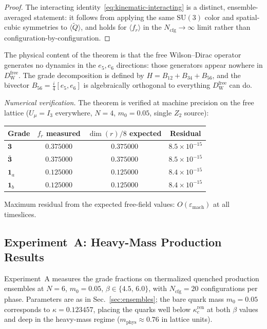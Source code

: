 \documentclass[12pt]{article}
\theoremstyle{definition}
\theoremstyle{remark}
\newcommand{\su}{\mathrm{SU}}           %
\newcommand{\dW}{D_{\mathrm{W}}}        %
\newcommand{\kcren}{\kappa_{c}^{\mathrm{ren}}}      %
\newcommand{\Qtil}{\widetilde{Q}}                    %
\newcommand{\Ncfg}{N_{\mathrm{cfg}}}                  %
\begin{document}
\begin{proof}
		The interacting identity~\eqref{eq:kinematic-interacting} is a distinct,
		ensemble-averaged statement: it follows from applying the same $\su(3)$
		color and spatial-cubic symmetries to $\langle\Qtil\rangle$, and holds for
		$\langle f_r\rangle$ in the $\Ncfg\to\infty$ limit rather than
		configuration-by-configuration.
	\end{proof}	
	The physical content of the theorem is that the free Wilson--Dirac operator
	generates no dynamics in the $e_5, e_6$ directions: those generators appear
	nowhere in $\dW^{\mathrm{free}}$.  The grade decomposition is defined by
	$H = B_{12}+B_{34}+B_{56}$, and the bivector
	$B_{56} = \tfrac{i}{4}[e_5,e_6]$ is algebraically orthogonal to everything
	$\dW^{\mathrm{free}}$ can do.
	
	\medskip
	\noindent\textit{Numerical verification.}\enspace
	The theorem is verified at machine precision on the free lattice
	($U_\mu = I_3$ everywhere, $N=4$, $m_0=0.05$, single $Z_2$ source):
	\begin{center}
		\begin{tabular}{@{}lccc@{}}
			\toprule
			Grade & $f_r$ measured & $\dim(r)/8$ expected & Residual \\
			\midrule
			$\mathbf{3}$         & $0.375000$ & $0.375000$ & $8.5\times10^{-15}$ \\
			$\bar{\mathbf{3}}$   & $0.375000$ & $0.375000$ & $8.5\times10^{-15}$ \\
			$\mathbf{1}_a$       & $0.125000$ & $0.125000$ & $8.4\times10^{-15}$ \\
			$\mathbf{1}_b$       & $0.125000$ & $0.125000$ & $8.4\times10^{-15}$ \\
			\bottomrule
		\end{tabular}
	\end{center}
	Maximum residual from the expected free-field values:
	$O(\varepsilon_{\mathrm{mach}})$ at all timeslices.
	
	
	
	\subsection{Experiment~A: Heavy-Mass Production Results}
	\label{sec:experiment-A}
	
	Experiment~A measures the grade fractions on thermalized quenched production
	ensembles at $N=6$, $m_0=0.05$, $\beta\in\{4.5,\,6.0\}$, with $\Ncfg=20$
	configurations per phase.  Parameters are as in Sec.~\ref{sec:ensembles};
	the bare quark mass $m_0=0.05$ corresponds to $\kappa=0.123457$, placing
	the quarks well below $\kcren$ at both $\beta$ values and deep in the
	heavy-mass regime ($m_{\mathrm{phys}}\approx0.76$ in lattice units).
	
\end{document}
